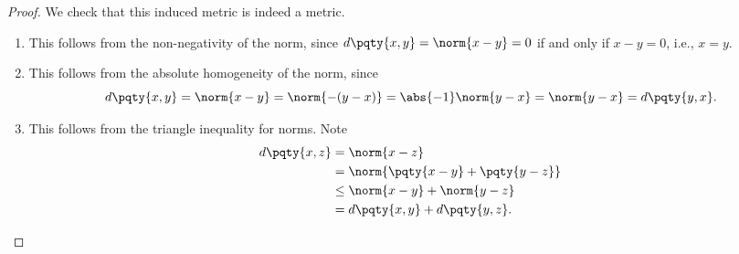 \begin{proof}
    We check that this induced metric is indeed a metric.
    
    \begin{enumerate}[label=(\roman*)]
        \item This follows from the non-negativity of the norm, since \(d\pqty{x, y} = \norm{x - y} = 0\) if and only if \(x - y = 0\), i.e., \(x = y\).
        \item This follows from the absolute homogeneity of the norm, since
        \[
            d\pqty{x, y} = \norm{x - y} = \norm{-(y - x)} = \abs{-1} \norm{y - x} = \norm{y - x} = d\pqty{y, x}.
        \]
        \item This follows from the triangle inequality for norms. Note
        \begin{align*}
            d\pqty{x, z} &= \norm{x - z} \\
            &= \norm{\pqty{x - y} + \pqty{y - z}} \\
            &\leq \norm{x - y} + \norm{y - z} \\
            &= d\pqty{x, y} + d\pqty{y, z}.
        \end{align*}
    \end{enumerate}
\end{proof}

